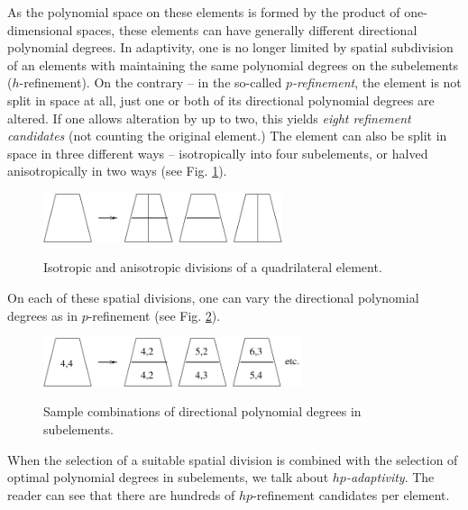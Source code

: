 \documentclass[final,3p,times,twocolumn]{elsarticle}
\begin{document}
As the polynomial
space on these elements is formed by the product 
of one-dimensional spaces, these elements 
can have generally different directional polynomial degrees. 
In adaptivity, one is no longer limited by spatial 
subdivision of an elements with maintaining the same 
polynomial degrees on the subelements ($h$-refinement). 
On the contrary -- in the so-called {\em $p$-refinement}, the element is not 
split in space at all, just one or both of its directional
polynomial degrees are altered. If one allows alteration by
up to two, this yields {\em eight refinement candidates}
(not counting the original element.) The element can also 
be split in space in three different ways -- isotropically 
into four subelements, or halved anisotropically in two ways
(see Fig. \ref{fig:quadsplit}).


\begin{figure}[!htb]
\begin{center}
 {
\includegraphics[width=7cm]{quad_split.pdf}
}
\end{center}
\vspace{-5mm}
\caption{Isotropic and anisotropic divisions of a quadrilateral element.}
\label{fig:quadsplit}
\end{figure}

On each of these spatial divisions, one can vary the 
directional polynomial degrees as in $p$-refinement
(see Fig. \ref{fig:quadsplit2}). 

\begin{figure}[!htb]
\begin{center}
 {
\includegraphics[width=7.6cm]{quad_split_2.pdf}
}
\end{center}
\vspace{-5mm}
\caption{Sample combinations of directional polynomial degrees in 
         subelements.}
\label{fig:quadsplit2}
\end{figure}

When the selection of a suitable spatial division is combined 
with the selection of optimal polynomial degrees in 
subelements, we talk about {\em $hp$-adaptivity}. 
The reader can see that there are hundreds of $hp$-refinement 
candidates per element.
\end{document}
